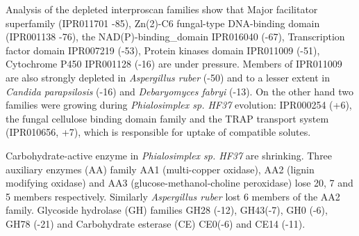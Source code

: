 \documentclass[fontsize=10pt, paper=a4,fleqn, ]{wlscirep}
\newcommand{\aspRub}{\textit{Aspergillus ruber}}
\newcommand{\debFab}{\textit{Debaryomyces fabryi}}
\newcommand{\canPar}{\textit{Candida parapsilosis}}
\newcommand{\phiSp}{\textit{Phialosimplex sp. HF37}}
\begin{document}
Analysis of the depleted interproscan families show that Major
facilitator superfamily (IPR011701 -85), Zn(2)-C6 fungal-type
DNA-binding domain (IPR001138 -76), the NAD(P)-binding\_domain
IPR016040 (-67), Transcription factor domain IPR007219 (-53), Protein
kinases domain IPR011009 (-51), Cytochrome P450 IPR001128 (-16) are
under pressure. Members of IPR011009 are also strongly depleted in
{\aspRub} (-50) and to a lesser extent in {\canPar} (-16) and
{\debFab} (-13). On the other hand two families were growing during
{\phiSp} evolution: IPR000254 (+6), the fungal cellulose binding
domain family and the TRAP transport system (IPR010656, +7), which is
responsible for uptake of compatible solutes. 

Carbohydrate-active enzyme in {\phiSp} are shrinking. Three auxiliary
enzymes (AA) family  AA1 (multi-copper oxidase), AA2 (lignin modifying
oxidase) and AA3 (glucose-methanol-choline peroxidase) lose 20, 7 and 5 members
respectively. Similarly {\aspRub} lost 6 members of the AA2
family. Glycoside hydrolase (GH) families GH28 (-12), GH43(-7), GH0
(-6), GH78 (-21) and Carbohydrate esterase (CE) CE0(-6) and CE14
(-11). 
\end{document}
